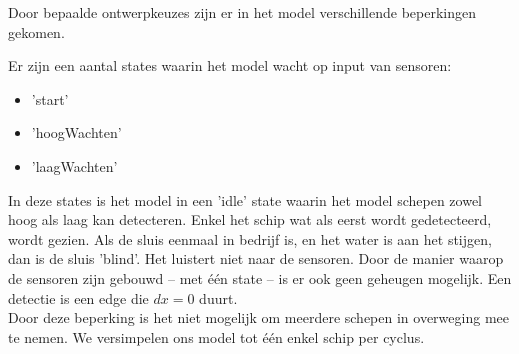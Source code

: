 \documentclass{article} %
\begin{document}
Door bepaalde ontwerpkeuzes zijn er in het model verschillende beperkingen gekomen. \par

Er zijn een aantal states waarin het model wacht op input van sensoren:

\begin{itemize}
    \item 'start'
    \item 'hoogWachten'
    \item 'laagWachten'
\end{itemize}

In deze states is het model in een 'idle' state waarin het model schepen zowel hoog als laag kan detecteren. Enkel het schip wat als eerst wordt gedetecteerd, wordt gezien. Als de sluis eenmaal in bedrijf is, en het water is aan het stijgen, dan is de sluis 'blind'. Het luistert niet naar de sensoren. Door de manier waarop de sensoren zijn gebouwd -- met één state -- is er ook geen geheugen mogelijk. Een detectie is een edge die \(dx=0\) duurt. \\
Door deze beperking is het niet mogelijk om meerdere schepen in overweging mee te nemen. We versimpelen ons model tot één enkel schip per cyclus.
\end{document}
